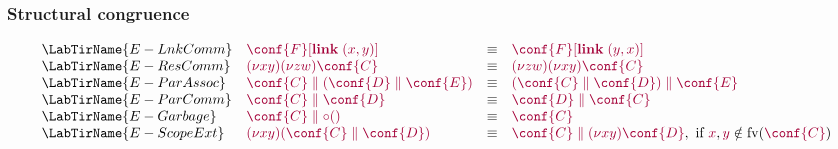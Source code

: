 \documentclass[main.tex]{subfiles}
\begin{document}
\subsubsection{Structural congruence}
\[
\begin{array}{llcl}
  \LabTirName{E-LnkComm}  & \tm{\plug{\conf{F}}{\link\;{\pair{x}{y}}}}
                          & \equiv & \tm{\plug{\conf{F}}{\link\;{\pair{y}{x}}}}
  \\
  \LabTirName{E-ResComm}  & \tm{\res{x}{y}{\res{z}{w}{\conf{C}}}}
                          & \equiv & \tm{\res{z}{w}{\res{x}{y}{\conf{C}}}}
  \\
  \LabTirName{E-ParAssoc} & \tm{\ppar{\conf{C}}{(\ppar{\conf{D}}{\conf{E}})}}
                          & \equiv & \tm{\ppar{(\ppar{\conf{C}}{\conf{D}})}{\conf{E}}}
  \\
  \LabTirName{E-ParComm}  & \tm{\ppar{\conf{C}}{\conf{D}}}
                          & \equiv & \tm{\ppar{\conf{D}}{\conf{C}}}
  \\
  \LabTirName{E-Garbage}  & \tm{\ppar{\conf{C}}{\child{\unit}}}
                          & \equiv & \tm{\conf{C}}
  \\
  \LabTirName{E-ScopeExt} & \tm{\res{x}{y}{(\ppar{\conf{C}}{\conf{D}}})}
                          & \equiv & \tm{\ppar{\conf{C}}{\res{x}{y}{\conf{D}}}},
                                     \text{ if }{\tm{x},\tm{y}\notin\fv(\tm{\conf{C}})}
\end{array}
\]
\end{document}
